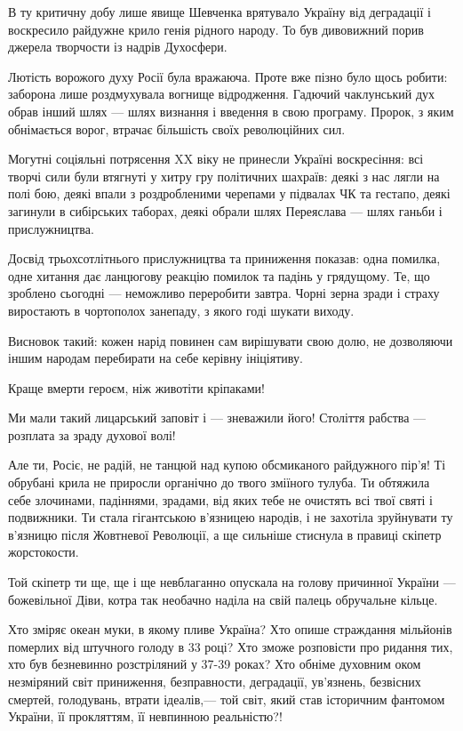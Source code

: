В ту критичну добу лише явище Шевченка врятувало Україну від деградації і
воскресило райдужне крило генія рідного народу. То був дивовижний порив джерела
творчости із надрів Духосфери.

Лютість ворожого духу Росії була вражаюча. Проте вже пізно було щось робити:
заборона лише роздмухувала вогнище відродження. Гадючий чаклунський дух обрав
інший шлях — шлях визнання і введення в свою програму. Пророк, з яким
обнімається ворог, втрачає більшість своїх революційних сил.

Могутні соціяльні потрясення XX віку не принесли Україні воскресіння: всі
творчі сили були втягнуті у хитру гру політичних шахраїв: деякі з нас лягли на
полі бою, деякі впали з роздробленими черепами у підвалах ЧК та гестапо, деякі
загинули в сибірських таборах, деякі обрали шлях Переяслава — шлях ганьби і
прислужництва.

Досвід трьохсотлітнього прислужництва та приниження показав: одна помилка, одне
хитання дає ланцюгову реакцію помилок та падінь у грядущому. Те, що зроблено
сьогодні — неможливо переробити завтра. Чорні зерна зради і страху виростають в
чортополох занепаду, з якого годі шукати виходу.

Висновок такий: кожен нарід повинен сам вирішувати свою долю, не дозволяючи
іншим народам перебирати на себе керівну ініціятиву.

Краще вмерти героєм, ніж животіти кріпаками!

Ми мали такий лицарський заповіт і — зневажили його! Століття рабства —
розплата за зраду духової волі!

Але ти, Росіє, не радій, не танцюй над купою обсмиканого райдужного пір'я! Ті
обрубані крила не приросли органічно до твого зміїного тулуба. Ти обтяжила себе
злочинами, падіннями, зрадами, від яких тебе не очистять всі твої святі і
подвижники. Ти стала гігантською в'язницею народів, і не захотіла зруйнувати ту
в'язницю після Жовтневої Революції, а ще сильніше стиснула в правиці скіпетр
жорстокости.

Той скіпетр ти ще, ще і ще невблаганно опускала на голову причинної України —
божевільної Діви, котра так необачно наділа на свій палець обручальне кільце.

Хто зміряє океан муки, в якому пливе Україна? Хто опише страждання мільйонів
померлих від штучного голоду в 33 році? Хто зможе розповісти про ридання тих,
хто був безневинно розстріляний у 37-39 роках? Хто обніме духовним оком
незміряний світ приниження, безправности, деградації, ув'язнень, безвісних
смертей, голодувань, втрати ідеалів,— той світ, який став історичним фантомом
України, її прокляттям, її невпинною реальністю?!

